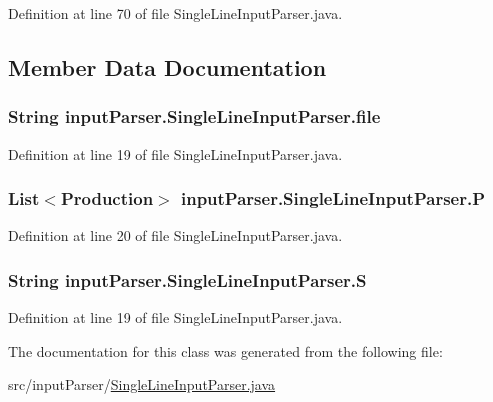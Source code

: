 Definition at line 70 of file Single\-Line\-Input\-Parser.\-java.



\subsection{Member Data Documentation}
\hypertarget{classinput_parser_1_1_single_line_input_parser_a46401abfc8915fde62cc6109f520028a}{
\subsubsection[{file}]{\setlength{\rightskip}{0pt plus 5cm}String {\bf input\-Parser.\-Single\-Line\-Input\-Parser.\-file}}}\label{classinput_parser_1_1_single_line_input_parser_a46401abfc8915fde62cc6109f520028a}


Definition at line 19 of file Single\-Line\-Input\-Parser.\-java.

\hypertarget{classinput_parser_1_1_single_line_input_parser_a07d3d934d89d64a72eb0a06b89e684a8}{
\subsubsection[{P}]{\setlength{\rightskip}{0pt plus 5cm}List$<${\bf Production}$>$ {\bf input\-Parser.\-Single\-Line\-Input\-Parser.\-P}}}\label{classinput_parser_1_1_single_line_input_parser_a07d3d934d89d64a72eb0a06b89e684a8}


Definition at line 20 of file Single\-Line\-Input\-Parser.\-java.

\hypertarget{classinput_parser_1_1_single_line_input_parser_afaca00d01ba13c5fc39fe11309aba895}{
\subsubsection[{S}]{\setlength{\rightskip}{0pt plus 5cm}String {\bf input\-Parser.\-Single\-Line\-Input\-Parser.\-S}}}\label{classinput_parser_1_1_single_line_input_parser_afaca00d01ba13c5fc39fe11309aba895}


Definition at line 19 of file Single\-Line\-Input\-Parser.\-java.



The documentation for this class was generated from the following file\-:\begin{DoxyCompactItemize}
\item 
src/input\-Parser/\hyperlink{_single_line_input_parser_8java}{Single\-Line\-Input\-Parser.\-java}\end{DoxyCompactItemize}
